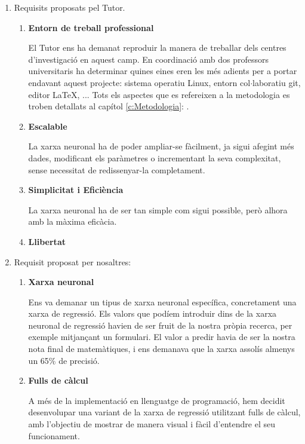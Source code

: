 \begin{enumerate}
 \item Requisits proposats pel Tutor.
    \begin{enumerate}
        \item \textbf{Entorn de treball professional}

        El Tutor ens ha demanat reproduir la manera de treballar dels centres d'investigació en aquest camp. En coordinació amb dos professors universitaris ha determinar quines eines eren les més adients per a portar endavant aquest projecte: sistema operatiu Linux, entorn col$\cdot$laboratiu git, editor LaTeX, ... Tots els aspectes que es refereixen a la metodologia es troben detallats al capítol \ref{c:Metodologia}: .

        \item \textbf{Escalable}

        La xarxa neuronal ha de poder ampliar-se fàcilment, ja sigui afegint més dades, modificant els paràmetres o incrementant la seva complexitat, sense necessitat de redissenyar-la completament.

        \item \textbf{Simplicitat i Eficiència}

        La xarxa neuronal ha de ser tan simple com sigui possible, però alhora amb la màxima eficàcia.

        \item \textbf{Llibertat}

    \end{enumerate}
\clearpage
 \item Requisit proposat per nosaltres:
    \begin{enumerate}
        \item \textbf{Xarxa neuronal}

        Ens va demanar un tipus de xarxa neuronal específica, concretament una xarxa de regressió. Els valors que podíem introduir dins de la xarxa neuronal de regressió havien de ser fruit de la nostra pròpia recerca, per exemple mitjançant un formulari. El valor a predir havia de ser la nostra nota final de matemàtiques, i ens demanava que la xarxa assolís almenys un 65\% de precisió.

        \item \textbf{Fulls de càlcul}

        A més de la implementació en llenguatge de programació, hem decidit desenvolupar una variant de la xarxa de regressió utilitzant fulls de càlcul, amb l’objectiu de mostrar de manera visual i fàcil d'entendre el seu funcionament.
    \end{enumerate}

\end{enumerate}









%
